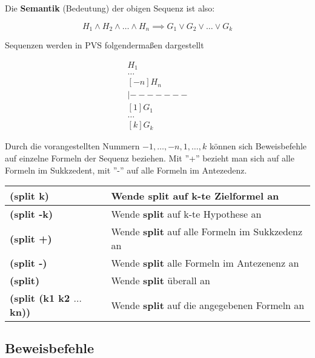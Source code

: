 \documentclass{scrartcl}
\begin{document}
Die \textbf{Semantik} (Bedeutung) der obigen Sequenz ist also:

\begin{equation*}
	H_1 \wedge H_2 \wedge \ldots \wedge H_n \implies G_1 \vee G_2 \vee \ldots \vee G_k
\end{equation*}

Sequenzen werden in PVS folgendermaßen dargestellt

\begin{align*}
	[-1] H_1 \\
	\ldots \\
	[-n] H_n \\
	|------- \\
	[1] G_1 \\
	\ldots \\
	[k] G_k
\end{align*}

Durch die vorangestellten Nummern $ -1,\ldots,-n,1,\ldots,k $ können sich Beweisbefehle auf einzelne Formeln der Sequenz beziehen. Mit ''+'' bezieht man sich auf alle Formeln im Sukkzedent, mit ''-'' auf alle Formeln im Antezedenz. \\

\renewcommand{\arraystretch}{2}
\begin{tabular}{l|l}
	\textbf{(split k)} & Wende \textbf{split} auf k-te Zielformel an \\
	\hline
	\textbf{(split -k)} & Wende \textbf{split} auf k-te Hypothese an \\
	\hline
	\textbf{(split +)} & Wende \textbf{split} auf alle Formeln im Sukkzedenz an \\
	\hline
	\textbf{(split -)} & Wende \textbf{split} alle Formeln im Antezenenz an \\
	\hline
	\textbf{(split)} & Wende \textbf{split} überall an \\
	\hline
	\textbf{(split (k1 k2 $ \ldots $ kn))} & Wende \textbf{split} auf die angegebenen Formeln an
\end{tabular}

\subsection{Beweisbefehle}
\end{document}
